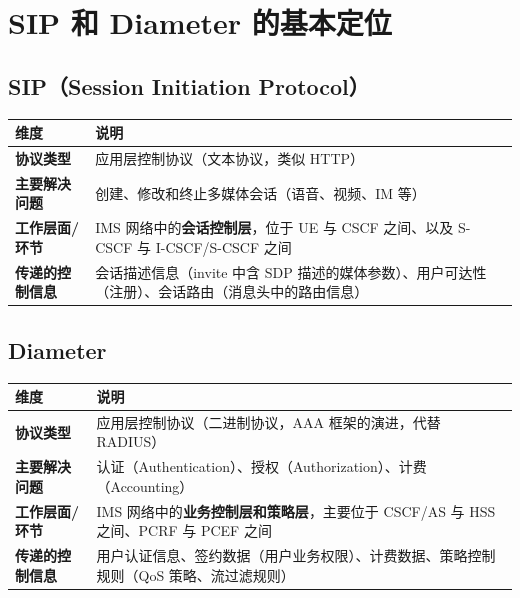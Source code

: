 \documentclass[12pt,a4paper]{ctexart}
\begin{document}
\section{SIP 和 Diameter 的基本定位}

\subsection{SIP（Session Initiation Protocol）}

\begin{table}[htbp]
\centering
\scriptsize
\begin{tabular}{>{\bfseries}p{2.8cm} p{11.2cm}}
\toprule
\textbf{维度} & \textbf{说明} \\
\midrule
协议类型 & 应用层控制协议（文本协议，类似 HTTP） \\
\addlinespace
主要解决问题 & 创建、修改和终止多媒体会话（语音、视频、IM 等） \\
\addlinespace
工作层面/环节 & IMS 网络中的\textbf{会话控制层}，位于 UE 与 CSCF 之间、以及 S-CSCF 与 I-CSCF/S-CSCF 之间 \\
\addlinespace
传递的控制信息 & 会话描述信息（invite 中含 SDP 描述的媒体参数）、用户可达性（注册）、会话路由（消息头中的路由信息） \\
\bottomrule
\end{tabular}
\end{table}

\subsection{Diameter}

\begin{table}[htbp]
\centering
\scriptsize
\begin{tabular}{>{\bfseries}p{2.8cm} p{11.2cm}}
\toprule
\textbf{维度} & \textbf{说明} \\
\midrule
协议类型 & 应用层控制协议（二进制协议，AAA 框架的演进，代替 RADIUS） \\
\addlinespace
主要解决问题 & 认证（Authentication）、授权（Authorization）、计费（Accounting） \\
\addlinespace
工作层面/环节 & IMS 网络中的\textbf{业务控制层和策略层}，主要位于 CSCF/AS 与 HSS 之间、PCRF 与 PCEF 之间 \\
\addlinespace
传递的控制信息 & 用户认证信息、签约数据（用户业务权限）、计费数据、策略控制规则（QoS 策略、流过滤规则） \\
\bottomrule
\end{tabular}
\end{table}
\end{document}
